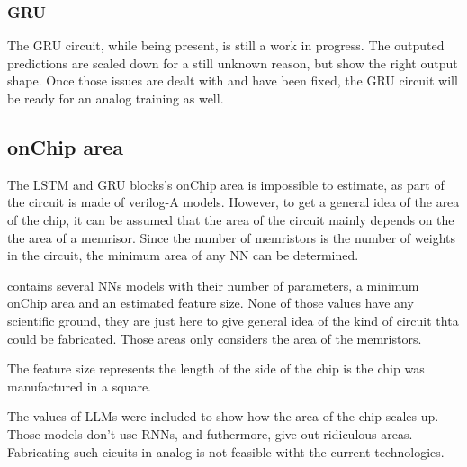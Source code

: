 \subsubsection{\ac{GRU}}

The \ac{GRU} circuit, while being present, is still a work in progress. The outputed predictions are scaled down for a still unknown reason, but show the right output shape. Once those issues are dealt with and have been fixed, the \ac{GRU} circuit will be ready for an analog training as well.

\subsection{onChip area}

The \ac{LSTM} and \ac{GRU} blocks's onChip area is impossible to estimate, as part of the circuit is made of verilog-A models. However, to get a general idea of the area of the chip, it can be assumed that the area of the circuit mainly depends on the the area of a memrisor. Since the number of memristors is the number of weights in the circuit, the minimum area of any \ac{NN} can be determined.

 contains several \acp{NN} models with their number of parameters, a minimum onChip area and an estimated feature size. None of those values have any scientific ground, they are just here to give general idea of the kind of circuit thta could be fabricated. Those areas only considers the area of the memristors.

The feature size represents the length of the side of the chip is the chip was manufactured in a square.

The values of \acp{LLM} were included to show how the area of the chip scales up. Those models don't use \acp{RNN}, and futhermore, give out ridiculous areas. Fabricating such cicuits in analog is not feasible witht the current technologies.

